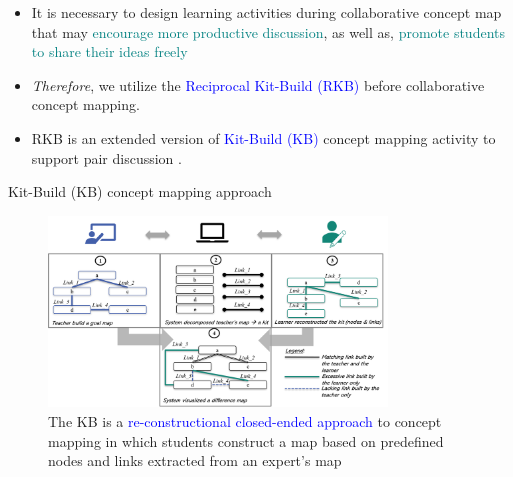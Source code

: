 \begin{frame}{}
    \begin{itemize}
        \item <1-2> It is necessary to design learning activities during collaborative concept map that may \textcolor{teal}{encourage more productive discussion}, as well as, \textcolor{teal}{promote students to share their ideas freely}\\
        \item <2> \emph{Therefore}, we utilize the \textcolor{blue}{Reciprocal Kit-Build (RKB)} before collaborative concept mapping. 
        \item <3>  RKB is an extended version of \textcolor{blue}{Kit-Build (KB)} concept mapping activity to support pair discussion \cite{Wunnasri2018ReciprocalCollaboration,Wunnasri2018ReciprocalUnderstanding}.
    \end{itemize}
    
\end{frame}

\begin{frame}{Kit-Build (KB) concept mapping approach \cite{Hirashima2015}}

    \begin{figure}[tb]
        \begin{center}
            \includegraphics[width=90mm]{images/kb_flow.png}
        \end{center}
        \caption{The KB is a \textcolor{blue}{re-constructional closed-ended approach} to concept mapping
        in which students construct a map based on predefined nodes and
        links extracted from an expert's map \cite{Hirashima2015,Hirashima2019ReconstructionalReconstruction}}
        \label{intro::kbmap}
    \end{figure}
\end{frame}


